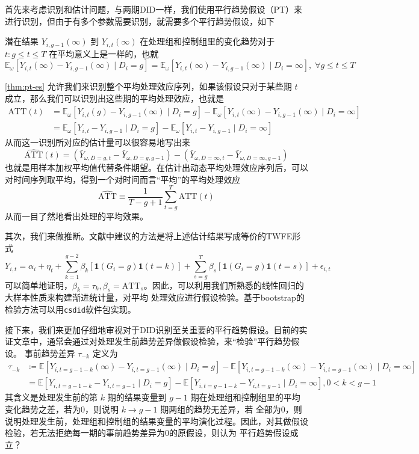 \documentclass[../didNotes.tex]{subfiles}
\begin{document}
首先来考虑识别和估计问题，与两期DID一样，我们使用平行趋势假设（PT）来进行识别，但由于有多个参数需要识别，就需要多个平行趋势假设，如下
\begin{assumption}[PT-ES]\label{thm:pt-es}
  潜在结果 $Y_{i,g-1}(\infty)$ 到 $Y_{i,t}(\infty)$ 在处理组和控制组里的变化趋势对于 $t:g\le t\le T$ 在平均意义上是一样的，也就
  $$
  \mathbb{E}_{\omega}[Y_{i,t}(\infty) -Y_{i,g-1}(\infty) \mid D_i=g] =
  \mathbb{E}_{\omega}[Y_{i,t}(\infty) - Y_{i,g-1}(\infty) \mid D_i=\infty], \; \forall g \le t \le T
  $$
\end{assumption}
\autoref{thm:pt-es} 允许我们来识别整个平均处理效应序列，如果该假设只对于某些期 $t$ 成立，那么我们可以识别出这些期的平均处理效应，也就是
\begin{align*}
  \text{ATT}(t) &= \mathbb{E}_{\omega}[Y_{i,t}(g)-Y_{i,g-1}(\infty) \mid D_{i}=g] -
  \mathbb{E}_{\omega}[Y_{i,t}(\infty)-Y_{i,g-1}(\infty) \mid D_{i}=\infty] \\
  &= \mathbb{E}_{\omega}[Y_{i,t}-Y_{i,g-1} \mid D_{i}=g] -
  \mathbb{E}_{\omega}[Y_{i,t}-Y_{i,g-1} \mid D_{i}=\infty]
\end{align*}
从而这一识别所对应的估计量可以很容易地写出来
$$
\widehat{\text{ATT}}(t) = (\bar{Y}_{\omega, D=g, t}-\bar{Y}_{\omega, D=g, g-1}) -
(\bar{Y}_{\omega, D=\infty, t}-\bar{Y}_{\omega, D=\infty, g-1})
$$
也就是用样本加权平均值代替条件期望。在估计出动态平均处理效应序列后，可以对时间序列取平均，得到一个对时间而言``平均''的平均处理效应
$$
\widehat{\text{ATT}} \equiv \frac{1}{T-g+1} \sum_{t=g}^{T} \widehat{\text{ATT}}(t)
$$
从而一目了然地看出处理的平均效果。

其次，我们来做推断。文献中建议的方法是将上述估计结果写成等价的TWFE形式
$$
Y_{i,t} = \alpha_i + \eta_t + \sum_{k=1}^{g-2} \beta_k \left[ \mathbf{1}(G_i=g)
\mathbf{1}(t=k) \right] +
\sum_{s=g}^{T} \beta_s  \left[ \mathbf{1}(G_i=g) \mathbf{1}(t=s) \right] + \epsilon_{i,t}
$$
可以简单地证明，$\beta_{k}=\tau_{k},\beta_{s}=\text{ATT}_s$。因此，可以利用我们所熟悉的线性回归的大样本性质来构建渐进统计量，对平均
处理效应进行假设检验。基于bootstrap的检验方法可以用\texttt{csdid}软件包实现。%

接下来，我们来更加仔细地审视对于DID识别至关重要的平行趋势假设。目前的实证文章中，通常会通过对处理发生前趋势差异做假设检验，来``检验''平行趋势假设。
事前趋势差异 $\tau_{-k}$ 定义为
\begin{align*}
  \tau_{-k} &\coloneqq \mathbb{E}[Y_{i,t=g-1-k}(\infty)-Y_{i,t=g-1}(\infty) \mid D_i = g] -
  \mathbb{E}[Y_{i,t=g-1-k}(\infty)-Y_{i,t=g-1}(\infty) \mid D_i = \infty] \\
  &= \mathbb{E}[Y_{i,t=g-1-k}-Y_{i,t=g-1} \mid D_i = g] -
  \mathbb{E}[Y_{i,t=g-1-k}-Y_{i,t=g-1} \mid D_i = \infty], 0 < k < g-1
\end{align*}
其含义是处理发生前的第 $k$ 期的结果变量到 $g-1$ 期在处理组和控制组里的平均变化趋势之差，若为0，则说明 $k \to g-1$ 期两组的趋势无差异，若
全部为0，则说明处理发生前，处理组和控制组的结果变量的平均演化过程。因此，对其做假设检验，若无法拒绝每一期的事前趋势差异为0的原假设，则认为
平行趋势假设成立？
\end{document}
